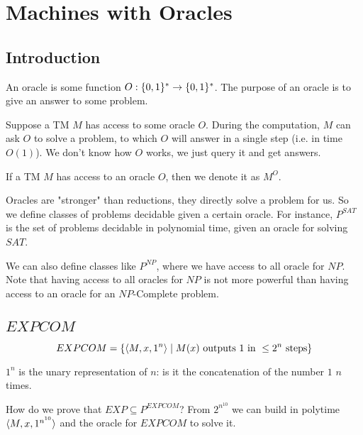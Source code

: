 \section{Machines with Oracles}\label{sec:oracles}

\subsection{Introduction}\label{subsec:oracle_intro}
    An oracle is some function $O : \{ 0,1 \}^* \rightarrow \{ 0,1 \}^*$.
    The purpose of an oracle is to give an answer to some problem.

    Suppose a TM $M$ has access to some oracle $O$.
    During the computation, $M$ can ask $O$ to solve a problem, to which $O$ will answer in a single step (i.e. in time $O(1)$).
    We don't know how $O$ works, we just query it and get answers.

    If a TM $M$ has access to an oracle $O$, then we denote it as $M^O$.

    Oracles are "stronger" than reductions, they directly solve a problem for us.
    So we define classes of problems decidable given a certain oracle. For instance, $P^{SAT}$ is the set of problems decidable in polynomial time, given an oracle for solving $SAT$.

    We can also define classes like $P^{NP}$, where we have access to all oracle for $NP$.
    Note that having access to all oracles for $NP$ is not more powerful than having access to an oracle for an $NP$-Complete problem.


\subsection{$EXPCOM$}\label{subsec:oracle_subsec}
    \[ EXPCOM = \{ \text{\textlangle} M,x,1^n \text{\textrangle} \st M(x) \text{ outputs } 1 \text{ in } \leq 2^n \text{ steps}\} \]

    $1^n$ is the unary representation of $n$: is it the concatenation of the number $1$ $n$ times.

    How do we prove that $EXP \subseteq P^{EXPCOM}$?
    From $2^{n^{10}}$ we can build in polytime $\text{\textlangle} M,x,1^{n^{10}} \text{\textrangle}$ and the oracle for $EXPCOM$ to solve it.